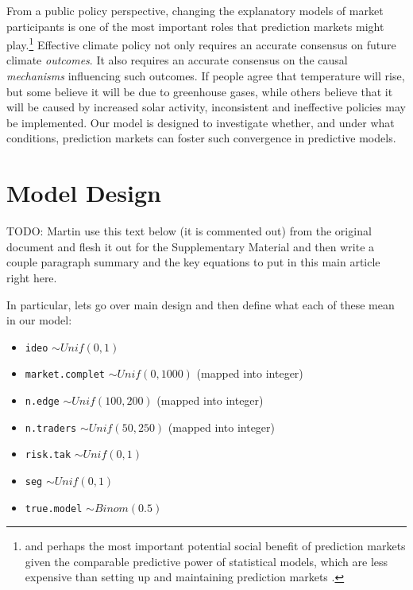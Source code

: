 \documentclass{article}\usepackage[]{graphicx}\usepackage[]{color}
\begin{document}
From a public policy perspective, changing the explanatory models of market participants is one of the most important roles that prediction markets might play.\footnote{and perhaps the most important potential social benefit of prediction markets given the comparable predictive power of statistical models, which are less expensive than setting up and maintaining prediction markets \cite{goel_prediction_2010}.} Effective climate policy not only requires an accurate consensus on future climate \emph{outcomes}. It also requires an accurate consensus on the causal \emph{mechanisms} influencing such outcomes. If people agree that temperature will rise, but some believe it will be due to greenhouse gases, while others believe that it will be caused by increased solar activity, inconsistent and ineffective policies may be implemented. Our model is designed to investigate whether, and under what conditions, prediction markets can foster such convergence in predictive models.

\section*{Model Design}

TODO: Martin use this text below (it is commented out) from the original document and flesh it out for the Supplementary Material and then write a couple paragraph summary and the key equations to put in this main article right here.

In particular, lets go over main design and then define what each of these mean in our model: 	
\begin{itemize}
	\item \texttt{ideo} $\sim Unif(0,1)$
	\item \texttt{market.complet} $\sim Unif(0,1000)$ (mapped into integer)
	\item  \texttt{n.edge} $\sim Unif(100,200)$ (mapped into integer)
	\item  \texttt{n.traders} $\sim Unif(50,250)$ (mapped into integer)
	\item \texttt{risk.tak}  $\sim Unif(0,1)$
	\item  \texttt{seg} $\sim Unif(0,1)$
	\item  \texttt{true.model} $\sim Binom(0.5)$
\end{itemize}
\end{document}

